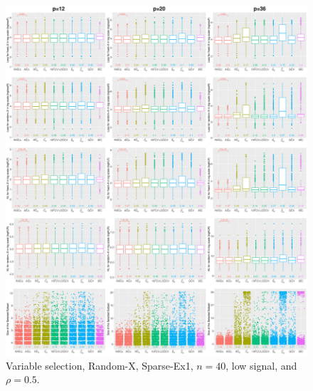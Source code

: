 \begin{figure}[!ht]
\centering
\includegraphics[width=\textwidth]{figures/supplement/randomx/subset_selection/Sparse-Ex1_n40_lsnr_rho05.eps}
\caption{Variable selection, Random-X, Sparse-Ex1, $n=40$, low signal, and $\rho=0.5$.}
\end{figure}
\clearpage
